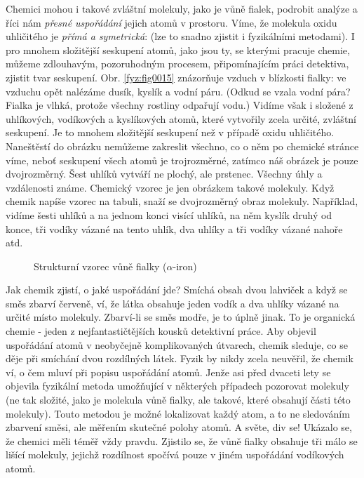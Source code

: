     Chemici mohou i takové zvláštní molekuly, jako je vůně fialek, podrobit analýze a říci nám
    \emph{přesné uspořádání} jejich atomů v prostoru. Víme, že molekula oxidu uhličitého je
    \emph{přímá a symetrická}:  (lze to snadno zjistit i fyzikálními
    metodami). I pro mnohem složitější seskupení atomů, jako jsou ty, se kterými pracuje chemie,
    můžeme zdlouhavým, pozoruhodným procesem, připomínajícím práci detektiva, zjistit tvar
    seskupení. Obr. \ref{fyz:fig0015} znázorňuje vzduch v blízkosti fialky: ve vzduchu opět nalézáme
    dusík, kyslík a vodní páru. (Odkud se vzala vodní pára? Fialka je vlhká, protože všechny
    rostliny odpařují vodu.) Vidíme však i  složené z uhlíkových, vodíkových a
    kyslíkových atomů, které vytvořily zcela určité, zvláštní seskupení. Je to mnohem složitější
    seskupení než v případě oxidu uhličitého. Naneštěstí do obrázku nemůžeme zakreslit všechno, co o
    něm po chemické stránce víme, neboť seskupení všech atomů je trojrozměrné, zatímco náš obrázek
    je pouze dvojrozměrný. Šest uhlíků vytváří ne plochý, ale  prstenec. Všechny úhly
    a vzdálenosti známe. Chemický vzorec je jen obrázkem takové molekuly. Když chemik napíše vzorec
    na tabuli, snaží se  dvojrozměrný obraz molekuly. Například, vidíme 
    šesti uhlíků a na jednom konci visící  uhlíků, na něm kyslík druhý od konce, tři
    vodíky vázané na tento uhlík, dva uhlíky a tři vodíky vázané nahoře atd.

    \begin{figure}[hbt!]    %
      \centering
      \caption{Strukturní vzorec vůně fialky (\(\alpha\)-iron) \cite[s.~24]{Feynman01}}
      \label{fyz:fig0016}
    \end{figure}

    Jak chemik zjistí, o jaké uspořádání jde? Smíchá obsah dvou lahviček a když se směs zbarví
    červeně, ví, že látka obsahuje jeden vodík a dva uhlíky vázané na určité místo molekuly.
    Zbarví-li se směs modře, je to úplně jinak. To je organická chemie - jeden z nejfantastičtějších
    kousků detektivní práce. Aby objevil uspořádání atomů v neobyčejně komplikovaných útvarech,
    chemik sleduje, co se děje při smíchání dvou rozdílných látek. Fyzik by nikdy zcela neuvěřil, že
    chemik ví, o čem mluví při popisu uspořádání atomů. Jenže asi před dvaceti lety se objevila
    fyzikální metoda umožňující v některých případech pozorovat molekuly (ne tak složité, jako je
    molekula vůně fialky, ale takové, které obsahují části této molekuly). Touto metodou je možné
    lokalizovat každý atom, a to ne sledováním zbarvení směsi, ale měřením skutečné polohy atomů. A
    světe, div se! Ukázalo se, že chemici měli téměř vždy pravdu. Zjistilo se, že vůně fialky
    obsahuje tři málo se lišící molekuly, jejichž rozdílnost spočívá pouze v jiném uspořádání
    vodíkových atomů. 
    
